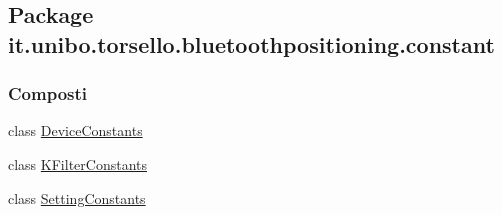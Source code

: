 \hypertarget{namespaceit_1_1unibo_1_1torsello_1_1bluetoothpositioning_1_1constant}{}\subsection{Package it.\+unibo.\+torsello.\+bluetoothpositioning.\+constant}
\label{namespaceit_1_1unibo_1_1torsello_1_1bluetoothpositioning_1_1constant}
\subsubsection*{Composti}
\begin{DoxyCompactItemize}
\item 
class \hyperlink{classit_1_1unibo_1_1torsello_1_1bluetoothpositioning_1_1constant_1_1DeviceConstants}{Device\+Constants}
\item 
class \hyperlink{classit_1_1unibo_1_1torsello_1_1bluetoothpositioning_1_1constant_1_1KFilterConstants}{K\+Filter\+Constants}
\item 
class \hyperlink{classit_1_1unibo_1_1torsello_1_1bluetoothpositioning_1_1constant_1_1SettingConstants}{Setting\+Constants}
\end{DoxyCompactItemize}
